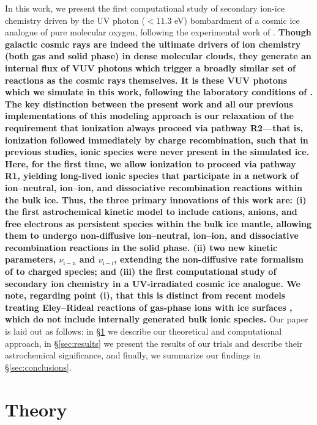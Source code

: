 \documentclass[journal=aesccq,manuscript=article,layout=twocolumn]{achemso}
\begin{document}
In this work, we present the first computational study of secondary ion-ice chemistry driven by the UV photon ($<11.3$ eV) bombardment of a cosmic ice analogue of pure molecular oxygen, following the experimental work of \citet{gerakines_ultraviolet_1996}. \textbf{Though galactic cosmic rays are indeed the ultimate drivers of ion chemistry (both gas and solid phase) in dense molecular clouds, they generate an internal flux of VUV photons which trigger a broadly similar set of reactions as the cosmic rays themselves. It is these VUV photons which we simulate in this work, following the laboratory conditions of \citet{gerakines_ultraviolet_1996}.} \textbf{The key distinction between the present work and all our previous implementations of this modeling approach \citep{shingledecker_general_2018,mullikin_new_2021} is our relaxation of the requirement that ionization always proceed via pathway R2---that is, ionization followed immediately by charge recombination, such that in previous studies, ionic species were never present in the simulated ice. Here, for the first time, we allow ionization to proceed via pathway R1, yielding long-lived ionic species that participate in a network of ion--neutral, ion--ion, and dissociative recombination reactions within the bulk ice. Thus, the three primary innovations of this work are: (i) the first astrochemical kinetic model to include cations, anions, and free electrons as persistent species within the bulk ice mantle, allowing them to undergo non-diffusive ion–neutral, ion–ion, and dissociative recombination reactions in the solid phase.  (ii) two new kinetic parameters, $\nu_\mathrm{i-n}$ and $\nu_\mathrm{i-i}$, extending the non-diffusive rate formalism of \citet{shingledecker_simulating_2019} to charged species; and (iii) the first computational study of secondary ion chemistry in a UV-irradiated cosmic ice analogue. We note, regarding point (i), that this is distinct from recent models treating Eley–Rideal reactions of gas-phase ions with ice surfaces \citep{cui_exploring_2024}, which do not include internally generated bulk ionic species.} Our paper is laid out as follows: in \S\ref{sec:theory} we describe our theoretical and computational approach, in \S\ref{sec:results} we present the results of our trials and describe their astrochemical significance, and finally, we summarize our findings in \S\ref{sec:conclusions}. 

\section{Theory} \label{sec:theory}
\end{document}
